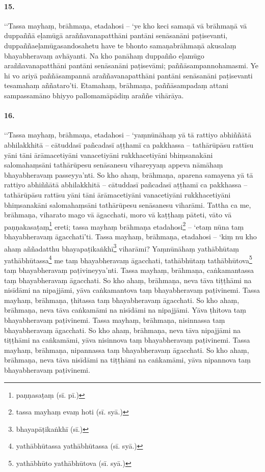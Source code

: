 \paragraph{15.} ‘‘Tassa mayhaṃ, brāhmaṇa, etadahosi – ‘ye kho keci samaṇā vā brāhmaṇā vā duppaññā eḷamūgā araññavanapatthāni pantāni senāsanāni paṭisevanti, duppaññaeḷamūgasandosahetu have te bhonto samaṇabrāhmaṇā akusalaṃ bhayabheravaṃ avhāyanti. Na kho panāhaṃ duppañño eḷamūgo araññavanapatthāni pantāni senāsanāni paṭisevāmi; paññāsampannohamasmi. Ye hi vo ariyā paññāsampannā araññavanapatthāni pantāni senāsanāni paṭisevanti tesamahaṃ aññataro’ti. Etamahaṃ, brāhmaṇa, paññāsampadaṃ attani sampassamāno bhiyyo pallomamāpādiṃ araññe vihārāya.


\paragraph{16.} ‘‘Tassa mayhaṃ, brāhmaṇa, etadahosi – ‘yaṃnūnāhaṃ yā tā rattiyo abhiññātā abhilakkhitā – cātuddasī pañcadasī aṭṭhamī ca pakkhassa – tathārūpāsu rattīsu yāni tāni ārāmacetiyāni vanacetiyāni rukkhacetiyāni bhiṃsanakāni salomahaṃsāni tathārūpesu senāsanesu vihareyyaṃ appeva nāmāhaṃ bhayabheravaṃ passeyya’nti. So kho ahaṃ, brāhmaṇa, aparena samayena yā tā rattiyo abhiññātā abhilakkhitā – cātuddasī pañcadasī aṭṭhamī ca pakkhassa – tathārūpāsu rattīsu yāni tāni ārāmacetiyāni vanacetiyāni rukkhacetiyāni bhiṃsanakāni salomahaṃsāni tathārūpesu senāsanesu viharāmi. Tattha ca me, brāhmaṇa, viharato mago vā āgacchati, moro vā kaṭṭhaṃ pāteti, vāto vā paṇṇakasaṭaṃ\footnote{paṇṇasaṭaṃ (sī. pī.)} ereti; tassa mayhaṃ brāhmaṇa etadahosi\footnote{tassa mayhaṃ evaṃ hoti (sī. syā.)} – ‘etaṃ nūna taṃ bhayabheravaṃ āgacchatī’ti. Tassa mayhaṃ, brāhmaṇa, etadahosi – ‘kiṃ nu kho ahaṃ aññadatthu bhayapaṭikaṅkhī\footnote{bhayapāṭikaṅkhī (sī.)} viharāmi? Yaṃnūnāhaṃ yathābhūtaṃ yathābhūtassa\footnote{yathābhūtassa yathābhūtassa (sī. syā.)} me taṃ bhayabheravaṃ āgacchati, tathābhūtaṃ tathābhūtova\footnote{yathābhūto yathābhūtova (sī. syā.)} taṃ bhayabheravaṃ paṭivineyya’nti. Tassa mayhaṃ, brāhmaṇa, caṅkamantassa taṃ bhayabheravaṃ āgacchati. So kho ahaṃ, brāhmaṇa, neva tāva tiṭṭhāmi na nisīdāmi na nipajjāmi, yāva caṅkamantova taṃ bhayabheravaṃ paṭivinemi. Tassa mayhaṃ, brāhmaṇa, ṭhitassa taṃ bhayabheravaṃ āgacchati. So kho ahaṃ, brāhmaṇa, neva tāva caṅkamāmi na nisīdāmi na nipajjāmi. Yāva ṭhitova taṃ bhayabheravaṃ paṭivinemi. Tassa mayhaṃ, brāhmaṇa, nisinnassa taṃ bhayabheravaṃ āgacchati. So kho ahaṃ, brāhmaṇa, neva tāva nipajjāmi na tiṭṭhāmi na caṅkamāmi, yāva nisinnova taṃ bhayabheravaṃ paṭivinemi. Tassa mayhaṃ, brāhmaṇa, nipannassa taṃ bhayabheravaṃ āgacchati. So kho ahaṃ, brāhmaṇa, neva tāva nisīdāmi na tiṭṭhāmi na caṅkamāmi, yāva nipannova taṃ bhayabheravaṃ paṭivinemi.

